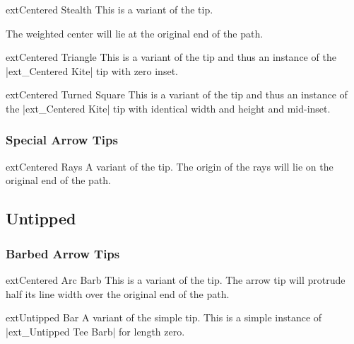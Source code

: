\begin{multicols}{2}
\begin{arrowtipsimple}{ext\textunderscore Centered Stealth}\tipcompat
    This is a variant of the  tip.
    
    The weighted center will lie at the original end of the path.
\end{arrowtipsimple}

\begin{arrowtipsimple}{ext\textunderscore Centered Triangle}\tipcompat
    This is a variant of the  tip and
    thus an instance of the |ext_Centered Kite| tip with zero inset.
\end{arrowtipsimple}

\begin{arrowtipsimple}{ext\textunderscore Centered Turned Square}\tipcompat
    This is a variant of the  tip and
    thus an instance of the |ext_Centered Kite| tip with identical width and height and mid-inset.
\end{arrowtipsimple}

\subsubsection{Special Arrow Tips}
\begin{arrowtipsimple}{ext\textunderscore Centered Rays}\tipcompat
    A variant of the  tip.
    The origin of the rays will lie on the original end of the path.
\end{arrowtipsimple}

\subsection{Untipped}
\subsubsection{Barbed Arrow Tips}
\begin{arrowtipsimple}{ext\textunderscore Centered Arc Barb}\tipcompat
    This is a variant of the  tip.
    The arrow tip will protrude half its line width over the original end of the path.
\end{arrowtipsimple}

\begin{arrowtipsimple}{ext\textunderscore Untipped Bar}\tipcompat
    A variant of the simple  tip.
    This is a simple instance of |ext_Untipped Tee Barb| for length zero.
    

\end{arrowtipsimple}
\end{multicols}

